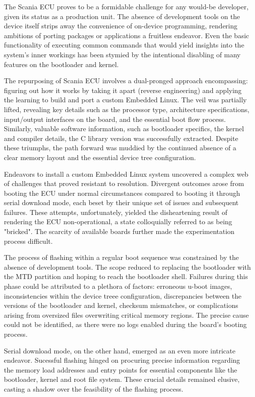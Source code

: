 The Scania ECU proves to be a formidable challenge for any would-be developer,  given its status as a production unit. The absence of development tools on the device itself strips away the convenience of on-device programming, rendering ambitions of porting packages or applications a fruitless endeavor. Even the basic functionality of executing common commands that would yield insights into the system's inner workings has been stymied by the intentional disabling of many features on the bootloader and kernel. 

The repurposing of Scania ECU involves a dual-pronged approach encompassing: figuring out how it works by taking it apart (reverse engineering) and applying the learning to build and port a custom Embedded Linux. The veil was partially lifted, revealing key details such as the processor type, architecture specifications, input/output interfaces on the board, and the essential boot flow process. Similarly, valuable software information, such as bootloader specifics, the kernel and compiler details, the C library version was successfully extracted. Despite these triumphs, the path forward was muddied by the continued absence  of a clear memory layout  and the essential device tree configuration.

Endeavors to install a custom Embedded Linux system uncovered a complex web of challenges that proved resistant to resolution. Divergent outcomes arose from booting the ECU under normal circumstances compared to booting it through serial download mode, each beset by their unique set of issues and subsequent failures. These attempts, unfortunately, yielded the disheartening result of rendering the  ECU non-operational, a state colloquially referred to as being "bricked". The scarcity of available boards further made the experimentation process difficult.

The process of flashing within a regular boot sequence was constrained by the absence of development tools. The scope reduced to replacing the bootloader with the MTD partition and hoping to reach the bootloader shell. Failures during this phase could be attributed to a plethora of factors: erroneous u-boot images, inconsistencies within the device treee configuration, discrepancies between the versions of the bootloader and kernel, checksum mismatches, or complications arising from oversized files overwriting critical memory regions. The precise cause could not be identified, as there were no logs enabled during the board's booting process.

Serial download mode, on the other hand, emerged as an even more intricate endeavor. Sucessful flashing hinged on procuring precise information regarding the memory load addresses and entry points for essential components like the bootloader, kernel and root file system. These crucial details remained elusive, casting a shadow over the feasibility of the flashing process.

